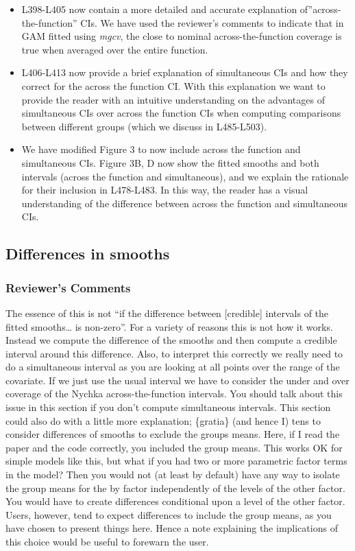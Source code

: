 \documentclass[
]{article}
\begin{document}
\begin{itemize}
\item
  L398-L405 now contain a more detailed and accurate explanation of''across-the-function'' CIs. We have used the reviewer's comments to indicate that in GAM fitted using \emph{mgcv}, the close to nominal across-the-function coverage is true when averaged over the entire function.
\item
  L406-L413 now provide a brief explanation of simultaneous CIs and how they correct for the across the function CI. With this explanation we want to provide the reader with an intuitive understanding on the advantages of simultaneous CIs over across the function CIs when computing comparisons between different groups (which we discuss in L485-L503).
\item
  We have modified Figure 3 to now include across the function and simultaneous CIs. Figure 3B, D now show the fitted smooths and both intervals (across the function and simultaneous), and we explain the rationale for their inclusion in L478-L483. In this way, the reader has a visual understanding of the difference between across the function and simultaneous CIs.
\end{itemize}

\hypertarget{differences-in-smooths}{%
\subsection{Differences in smooths}\label{differences-in-smooths}}

\hypertarget{reviewers-comments-8}{%
\subsubsection{Reviewer's Comments}\label{reviewers-comments-8}}

The essence of this is not ``if the difference between {[}credible{]} intervals of the fitted smooths\ldots{} is non-zero''. For a variety of reasons this is not how it works. Instead we compute the difference of the smooths and then compute a credible interval around this difference. Also, to interpret this correctly we really need to do a simultaneous interval as you are looking at all points over the range of the covariate. If we just use the usual interval we have to consider the under and over coverage of the Nychka across-the-function intervals. You should talk about this issue in this section if you don't compute simultaneous intervals.
This section could also do with a little more explanation; \{gratia\} (and hence I) tens to consider differences of smooths to exclude the groups means. Here, if I read the paper and the code correctly, you included the group means. This works OK for simple models like this, but what if you had two or more parametric factor terms in the model? Then you would not (at least by default) have any way to isolate the group means for the by factor independently of the levels of the other factor. You would have to create differences conditional upon a level of the other factor. Users, however, tend to expect differences to include the group means, as you have chosen to present things here. Hence a note explaining the implications of this choice would be useful to forewarn the user.
\end{document}
